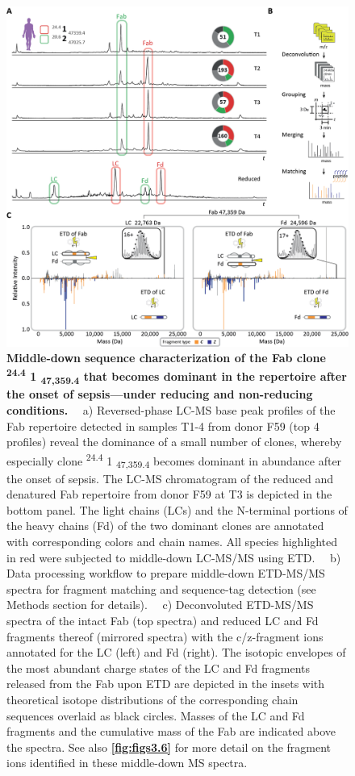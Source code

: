 \begin{figure}[!hptb]
  \center
  \includegraphics[]{Chapter.3/Figures/f3.png}
  \caption{
    \textbf{Middle-down sequence characterization of the Fab clone \textsuperscript{24.4} 1 \textsubscript{47,359.4} that becomes dominant in the repertoire after the onset of sepsis—under reducing and non-reducing conditions.}
    ~~a) Reversed-phase LC-MS base peak profiles of the Fab repertoire detected in samples T1-4 from donor F59 (top 4 profiles) reveal the dominance of a small number of clones, whereby especially clone \textsuperscript{24.4} 1 \textsubscript{47,359.4} becomes dominant in abundance after the onset of sepsis. The LC-MS chromatogram of the reduced and denatured Fab repertoire from donor F59 at T3 is depicted in the bottom panel. The light chains (LCs) and the N-terminal portions of the heavy chains (Fd) of the two dominant clones are annotated with corresponding colors and chain names. All species highlighted in red were subjected to middle-down LC-MS/MS using ETD. ~~b) Data processing workflow to prepare middle-down ETD-MS/MS spectra for fragment matching and sequence-tag detection (see Methods section for details). ~~c) Deconvoluted ETD-MS/MS spectra of the intact Fab (top spectra) and reduced LC and Fd fragments thereof (mirrored spectra) with the c/z-fragment ions annotated for the LC (left) and Fd (right). The isotopic envelopes of the most abundant charge states of the LC and Fd fragments released from the Fab upon ETD are depicted in the insets with theoretical isotope distributions of the corresponding chain sequences overlaid as black circles. Masses of the LC and Fd fragments and the cumulative mass of the Fab are indicated above the spectra. See also \textbf{\autoref{fig:figs3.6}} for more detail on the fragment ions identified in these middle-down MS spectra.
  }
  \label{fig:fig3.3}
\end{figure}

